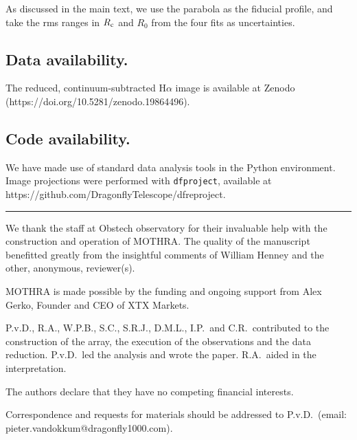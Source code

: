 \documentclass{nature_arxiv}
\begin{document}
\begin{methods}
As discussed in the main text, we use the parabola as the fiducial profile, and
take the rms ranges in $R_{\rm c}$ and $R_0$ from the four fits as uncertainties.


\subsection{Data availability.}
The reduced, continuum-subtracted H$\alpha$ image is available at Zenodo
(https://doi.org/10.5281/zenodo.19864496).

\subsection{Code availability.}
We have made use of standard data analysis tools in the Python
environment. Image projections were performed with {\tt dfproject},\cite{dfproject}
available at https://github.com/DragonflyTelescope/dfreproject.

\end{methods}

\vspace{3pt}
\noindent\rule{\linewidth}{0.4pt}
\vspace{3pt}



\begin{addendum}

 \item[Acknowledgements]
We thank the staff at Obstech observatory for their invaluable help with the
construction and operation of MOTHRA. The quality of the
manuscript benefitted greatly from the insightful comments of William Henney and
the other, anonymous, reviewer(s).

\item[Funding Statement]
MOTHRA is made possible by the funding and ongoing support from Alex Gerko,
Founder and CEO of XTX Markets.

 \item[Author Contributions] P.v.D., R.A., W.P.B., S.C., S.R.J., D.M.L., I.P.\ and
 C.R.\ contributed to the
construction of the array, the execution of the observations and the data reduction. P.v.D.\
led the analysis and wrote the paper. R.A.\ aided in the interpretation.

\item[Competing Interests]
The authors declare that they have no
   competing financial interests.
 \item[Additional Information] Correspondence and requests for
   materials should be addressed to P.v.D.~(email:
   pieter.vandokkum@dragonfly1000.com).


\end{addendum}


















\appendix
\end{document}
